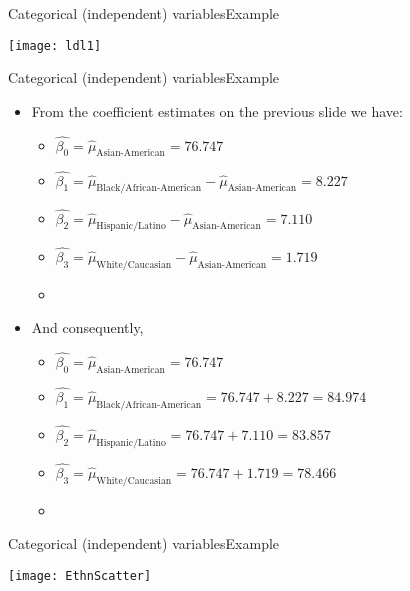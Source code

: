 \documentclass[xcolor=dvipsnames]{beamer}
\begin{document}
\begin{frame}{Categorical (independent) variables}{Example}
	\begin{center}
		\texttt{[image: ldl1]}
	\end{center}
\end{frame}

\begin{frame}{Categorical (independent) variables}{Example}
	\begin{itemize}
		\item From the coefficient estimates on the previous slide we have:
			\begin{itemize}
			\item $\hat{\beta_0} = \hat{\mu}_{\text{Asian-American}} = 76.747$
			\item $\hat{\beta_1} = \hat{\mu}_{\text{Black/African-American}} -\hat{\mu}_{\text{Asian-American}} = 8.227$
			\item $\hat{\beta_2} = \hat{\mu}_{\text{Hispanic/Latino}}- \hat{\mu}_{\text{Asian-American}} = 7.110$
			\item $\hat{\beta_3} = \hat{\mu}_{\text{White/Caucasian}} - \hat{\mu}_{\text{Asian-American}}= 1.719$
			\item[]
		\end{itemize}
		\item And consequently,
		\begin{itemize}
			\item $\hat{\beta_0} = \hat{\mu}_{\text{Asian-American}} = 76.747$
			\item $\hat{\beta_1} = \hat{\mu}_{\text{Black/African-American}} =  76.747 + 8.227= 84.974$
			\item $\hat{\beta_2} = \hat{\mu}_{\text{Hispanic/Latino}} =  76.747 + 7.110 = 83.857$
			\item $\hat{\beta_3} = \hat{\mu}_{\text{White/Caucasian}} =   76.747 + 1.719 = 78.466$
			\item[]
		\end{itemize}
	\end{itemize}
\end{frame}

\begin{frame}{Categorical (independent) variables}{Example}
	\begin{center}
		\texttt{[image: EthnScatter]}
	\end{center}
\end{frame}
\end{document}
